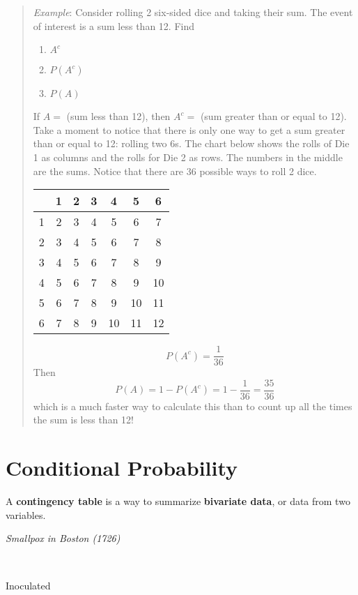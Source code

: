 \documentclass[
]{book}
\providecommand{\tightlist}{%
  \setlength{\itemsep}{0pt}\setlength{\parskip}{0pt}}
\begin{document}
\begin{quote}
\emph{Example}: Consider rolling 2 six-sided dice and taking their sum. The event of interest is a sum less than 12. Find

\begin{enumerate}
\def\labelenumi{\arabic{enumi}.}
\tightlist
\item
  \(A^c\)
\item
  \(P(A^c)\)
\item
  \(P(A)\)
\end{enumerate}

If \(A =\) (sum less than 12), then \(A^c =\) (sum greater than or equal to 12). Take a moment to notice that there is only one way to get a sum greater than or equal to 12: rolling two 6s. The chart below shows the rolls of Die 1 as columns and the rolls for Die 2 as rows. The numbers in the middle are the sums. Notice that there are 36 possible ways to roll 2 dice.

\begin{longtable}[]{@{}lcccccc@{}}
\toprule
& 1 & 2 & 3 & 4 & 5 & 6 \\
\midrule
\endhead
1 & 2 & 3 & 4 & 5 & 6 & 7 \\
2 & 3 & 4 & 5 & 6 & 7 & 8 \\
3 & 4 & 5 & 6 & 7 & 8 & 9 \\
4 & 5 & 6 & 7 & 8 & 9 & 10 \\
5 & 6 & 7 & 8 & 9 & 10 & 11 \\
6 & 7 & 8 & 9 & 10 & 11 & 12 \\
\bottomrule
\end{longtable}

\[ P(A^c) = \frac{1}{36}\]
Then \[P(A) = 1 - P(A^c) = 1-\frac{1}{36} = \frac{35}{36}\] which is a much faster way to calculate this than to count up all the times the sum is less than 12!
\end{quote}

\hypertarget{conditional-probability}{%
\section{Conditional Probability}\label{conditional-probability}}

A \textbf{contingency table} is a way to summarize \textbf{bivariate data}, or data from two variables.

\emph{Smallpox in Boston (1726)}

~

Inoculated

~
\end{document}
